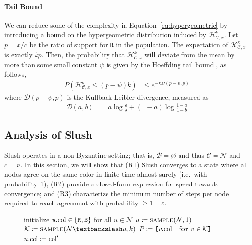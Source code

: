 \documentclass[letterpaper,twocolumn,10pt]{article}
\newcommand{\tronly}[2]{#1}
\let\emptyset\varnothing
\theoremstyle{definition}
\begin{document}
\begin{appendices}
{\paragraph{Tail Bound} We can reduce some of the complexity in Equation~\ref{eq:hypergeometric} by introducing a bound on the hypergeometric distribution induced by $\mathcal{H}^k_{\mathcal{C},x}$.
Let $p=x/c$ be the ratio of support for $\mathtt{R}$ in the population.
The expectation of $\mathcal{H}_{\mathcal{C}, x}^k$ is exactly $kp$.
Then, the probability that $\mathcal{H}_{\mathcal{C}, x}^k$ will deviate from the mean by more than some small constant $\psi$ is given by the Hoeffding tail bound \cite{hoeffding1963probability}, as follows,
\begin{equation}
\begin{split}
    P(\mathcal{H}_{\mathcal{C}, x}^k \leq (p-\psi)k) &\leq e^{-k\mathcal{D}(p-\psi, p)}
\end{split}
\end{equation}
where $\mathcal{D}(p-\psi, p)$ is the Kullback-Leibler divergence, measured as
\begin{equation}
\begin{split}
    \mathcal{D}(a, b) &= a \log \frac{a}{b} + (1 - a) \log \frac{1 - a}{1 - b}
\end{split}
\end{equation}}{}

\subsection{Analysis of Slush}\tronly{}{\vspace{-0.5em}}
Slush operates in a non-Byzantine setting; that is, $\mathcal{B} = \emptyset$ and thus $\mathcal{C} = \mathcal{N}$ and $c = n$.
In this section, we will show that
(R1) Slush converges to a state where all nodes agree on the same color in finite time almost surely (i.e.~with probability~1); 
(R2) provide a closed-form expression for speed towards convergence; and 
(R3) characterize the minimum number of steps per node required to reach agreement with probability $\ge 1-\varepsilon$.

\begin{figure}
    \small
\begin{algorithmic}[1]
    \State initialize $u.\textrm{col} \in \{\texttt{R},\texttt{B}\}$ for all $u\in\mathcal{N}$
        \State $u \coloneqq \Call{sample}{\mathcal{N}, 1}$
        \State $\mathcal{K} \coloneqq \Call{sample}{\mathcal{N}\textbackslash u, k}$
        \State $P \coloneqq \texttt{[}v.\textrm{col}\quad\textbf{for}\ v \in \mathcal{K}\texttt{]}$
                \State $u.\textrm{col} \coloneqq \textrm{col}'$
            \EndIf
        \EndFor
    \EndFor
{}\label{fig:slush_protocol_simulator}
\end{algorithmic}
\end{figure}


\end{appendices}
\end{document}
